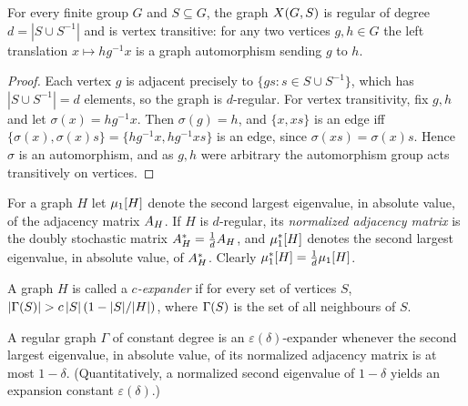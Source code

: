 \begin{lemma}
  \label{lem:cayley-vertex-transitive}
  For every finite group $G$ and $S \subseteq G$, the graph $X(G,S)$ is
  regular of degree $d = |S \cup S^{-1}|$ and is vertex transitive: for any two
  vertices $g, h \in G$ the left translation $x \mapsto h g^{-1} x$ is a graph
  automorphism sending $g$ to $h$.
\end{lemma}
\begin{proof}
  Each vertex $g$ is adjacent precisely to $\{ gs : s \in S \cup S^{-1}\}$,
  which has $|S \cup S^{-1}| = d$ elements, so the graph is $d$-regular. For
  vertex transitivity, fix $g,h$ and let $\sigma(x) = hg^{-1}x$. Then
  $\sigma(g) = h$, and $\{x, xs\}$ is an edge iff $\{\sigma(x), \sigma(x)s\} =
  \{hg^{-1}x, hg^{-1}xs\}$ is an edge, since $\sigma(xs) = \sigma(x)s$. Hence
  $\sigma$ is an automorphism, and as $g,h$ were arbitrary the automorphism
  group acts transitively on vertices.
\end{proof}

\begin{definition}
  \label{def:second-eigenvalue}
  For a graph $H$ let $\mu_{1}[H]$ denote the second largest eigenvalue, in
  absolute value, of the adjacency matrix $A_H$. If $H$ is $d$-regular, its
  \emph{normalized adjacency matrix} is the doubly stochastic matrix
  $A^{*}_H = \tfrac1d A_H$, and $\mu_{1}^{*}[H]$ denotes the second largest
  eigenvalue, in absolute value, of $A^{*}_H$. Clearly $\mu_{1}^{*}[H] = \tfrac1d
  \mu_{1}[H]$.
\end{definition}

\begin{definition}[$c$-expander]
  \label{def:expander}
  A graph $H$ is called a \emph{$c$-expander} if for every set of vertices $S$,
  $|\Gamma(S)| > c\,|S|\,(1 - |S|/|H|)$, where $\Gamma(S)$ is the set of all
  neighbours of $S$.
\end{definition}


\begin{lemma}
  \label{lem:expander-eigenvalue-equiv}
  \notready
  A regular graph $\Gamma$ of constant degree is an
  $\varepsilon(\delta)$-expander whenever the second largest eigenvalue, in
  absolute value, of its normalized adjacency matrix is at most $1 - \delta$.
  (Quantitatively, a normalized second eigenvalue of $1-\delta$ yields an
  expansion constant $\varepsilon(\delta)$.)
\end{lemma}

